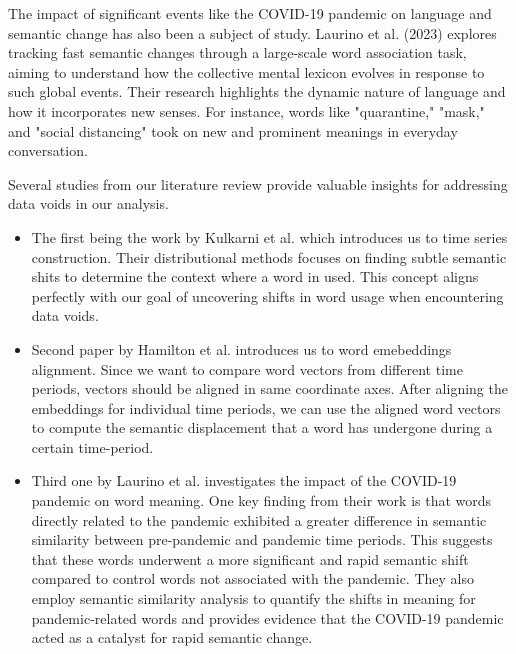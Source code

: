 The impact of significant events like the COVID-19 pandemic on language and semantic change has also been a subject of study.
Laurino et al. (2023) explores tracking fast semantic changes through a large-scale word association task, aiming to understand how the collective mental lexicon evolves in response to such global events.
Their research highlights the dynamic nature of language and how it incorporates new senses.
For instance, words like "quarantine," "mask," and "social distancing" took on new and prominent meanings in everyday conversation.

 \vspace{5mm}
Several studies from our literature review provide valuable insights for addressing data voids in our analysis.
\begin{itemize}
    \item The first being the work by Kulkarni et al. which introduces us to time series construction.
Their distributional methods focuses on finding subtle semantic shits to determine the context where a word in used.
This concept aligns perfectly with our goal of uncovering shifts in word usage when encountering data voids.
    \item Second paper by Hamilton et al. introduces us to word emebeddings alignment.
Since we want to compare word vectors from different time periods, vectors should be aligned in same coordinate axes.
After aligning the embeddings for individual time periods, we can use the aligned word vectors to compute the semantic displacement that a word has undergone during a certain time-period.
    \item Third one by Laurino et al. investigates the impact of the COVID-19 pandemic on word meaning.
One key finding from their work is that words directly related to the pandemic exhibited a greater difference in semantic similarity between pre-pandemic and pandemic time periods.
This suggests that these words underwent a more significant and rapid semantic shift compared to control words not associated with the pandemic.
They also employ semantic similarity analysis to quantify the shifts in meaning for pandemic-related words and provides evidence that the COVID-19 pandemic acted as a catalyst for rapid semantic change.

\end{itemize}